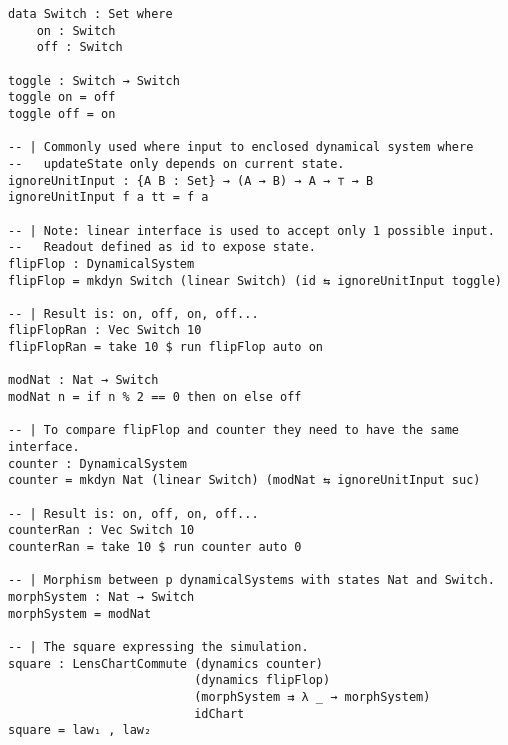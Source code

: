 \begin{verbatim}
data Switch : Set where
    on : Switch
    off : Switch

toggle : Switch → Switch
toggle on = off
toggle off = on

-- | Commonly used where input to enclosed dynamical system where
--   updateState only depends on current state.
ignoreUnitInput : {A B : Set} → (A → B) → A → ⊤ → B
ignoreUnitInput f a tt = f a

-- | Note: linear interface is used to accept only 1 possible input.
--   Readout defined as id to expose state.
flipFlop : DynamicalSystem
flipFlop = mkdyn Switch (linear Switch) (id ⇆ ignoreUnitInput toggle)

-- | Result is: on, off, on, off...
flipFlopRan : Vec Switch 10
flipFlopRan = take 10 $ run flipFlop auto on

modNat : Nat → Switch
modNat n = if n % 2 == 0 then on else off

-- | To compare flipFlop and counter they need to have the same interface.
counter : DynamicalSystem
counter = mkdyn Nat (linear Switch) (modNat ⇆ ignoreUnitInput suc)

-- | Result is: on, off, on, off...
counterRan : Vec Switch 10
counterRan = take 10 $ run counter auto 0

-- | Morphism between p dynamicalSystems with states Nat and Switch.
morphSystem : Nat → Switch
morphSystem = modNat

-- | The square expressing the simulation.
square : LensChartCommute (dynamics counter)
                          (dynamics flipFlop) 
                          (morphSystem ⇉ λ _ → morphSystem)
                          idChart
square = law₁ , law₂
\end{verbatim}



